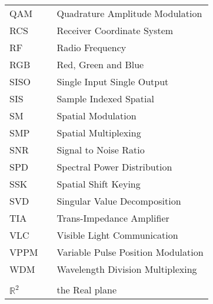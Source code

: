 \begin{center}
\begin{longtable}{lll}
		QAM & \dotfill & Quadrature Amplitude Modulation \\
		RCS & \dotfill & Receiver Coordinate System \\
    RF  & \dotfill & Radio Frequency \\
		RGB & \dotfill & Red, Green and Blue \\
		SISO & \dotfill & Single Input Single Output \\
		SIS & \dotfill & Sample Indexed Spatial \\
		SM & \dotfill & Spatial Modulation \\
		SMP & \dotfill & Spatial Multiplexing \\
		SNR & \dotfill & Signal to Noise Ratio \\
		SPD & \dotfill & Spectral Power Distribution \\
		SSK & \dotfill & Spatial Shift Keying \\
		SVD & \dotfill & Singular Value Decomposition \\
		TIA & \dotfill & Trans-Impedance Amplifier \\
    VLC  & \dotfill & Visible Light Communication \\
		VPPM & \dotfill & Variable Pulse Position Modulation \\
		WDM & \dotfill & Wavelength Division Multiplexing \\
		& \dotfill & \\
    $\mathbb{R}^{2}$  & \dotfill & the Real plane \\
  \end{longtable}
\end{center}